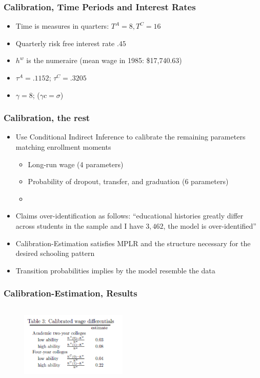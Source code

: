 \begin{frame}
	\frametitle{Calibration, Time Periods and Interest Rates}
		\begin{itemize}
		\item Time is measures in quarters: $T^A = 8, T^C = 16$
		\item Quarterly risk free interest rate $.45$
		\item $h^w$ is the numeraire (mean wage in 1985: \$17,740.63)
		\item $\tau^A = .1152$; $\tau^C = .3205$
		\item $\gamma = 8$; ($\gamma c = \sigma$)
		\end{itemize}
\end{frame}

\begin{frame}
	\frametitle{Calibration, the rest}
		\begin{itemize}
			\item Use Conditional Indirect Inference to calibrate the remaining parameters matching enrollment moments
				\begin{itemize}
					\item Long-run wage (4 parameters)
					\item Probability of dropout, transfer, and graduation (6 parameters)
					\item
				\end{itemize}
			\item Claims over-identification as follows: ``educational histories greatly differ across students in the sample and I have $3,462$, the model is over-identified''
			\item Calibration-Estimation satisfies MPLR and the structure necessary for the desired schooling pattern
			\item Transition probabilities implies by the model resemble the data
		\end{itemize}
\end{frame}

\begin{frame}
	\frametitle{Calibration-Estimation, Results}
			\begin{figure}[H] 
				\caption*{}
				\centering
				\includegraphics[width=2in, height=1.5in]{Figures/T/table3.png}
		\end{figure}
\end{frame}

